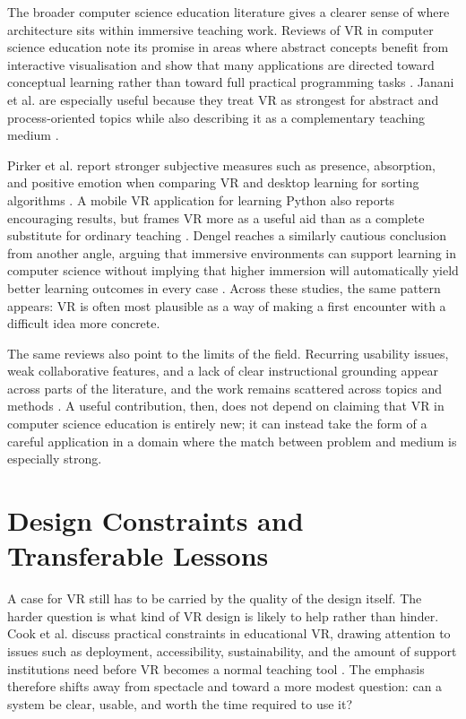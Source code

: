 The broader computer science education literature gives a clearer sense of where architecture sits within immersive teaching work. Reviews of VR in computer science education note its promise in areas where abstract concepts benefit from interactive visualisation and show that many applications are directed toward conceptual learning rather than toward full practical programming tasks \cite{pirker2020virtual,agbo2021application,janani2026virtual}. Janani et al. are especially useful because they treat VR as strongest for abstract and process-oriented topics while also describing it as a complementary teaching medium \cite{janani2026virtual}.

Pirker et al. report stronger subjective measures such as presence, absorption, and positive emotion when comparing VR and desktop learning for sorting algorithms \cite{pirker2021potential}. A mobile VR application for learning Python also reports encouraging results, but frames VR more as a useful aid than as a complete substitute for ordinary teaching \cite{mohamad2023immersive}. Dengel reaches a similarly cautious conclusion from another angle, arguing that immersive environments can support learning in computer science without implying that higher immersion will automatically yield better learning outcomes in every case \cite{dengel2020important}. Across these studies, the same pattern appears: VR is often most plausible as a way of making a first encounter with a difficult idea more concrete.

The same reviews also point to the limits of the field. Recurring usability issues, weak collaborative features, and a lack of clear instructional grounding appear across parts of the literature, and the work remains scattered across topics and methods \cite{janani2026virtual,agbo2021application}. A useful contribution, then, does not depend on claiming that VR in computer science education is entirely new; it can instead take the form of a careful application in a domain where the match between problem and medium is especially strong.

\section{Design Constraints and Transferable Lessons}

A case for VR still has to be carried by the quality of the design itself. The harder question is what kind of VR design is likely to help rather than hinder. Cook et al. discuss practical constraints in educational VR, drawing attention to issues such as deployment, accessibility, sustainability, and the amount of support institutions need before VR becomes a normal teaching tool \cite{cook2019challenges}. The emphasis therefore shifts away from spectacle and toward a more modest question: can a system be clear, usable, and worth the time required to use it?

